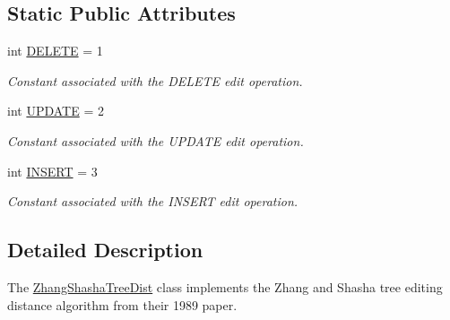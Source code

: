 \subsection*{Static Public Attributes}
\begin{DoxyCompactItemize}
\item 
\hypertarget{classxutools_1_1distances_1_1_zhang_shasha_tree_dist_a257fb5289527a7a6a44dfaf47324e270}{int \hyperlink{classxutools_1_1distances_1_1_zhang_shasha_tree_dist_a257fb5289527a7a6a44dfaf47324e270}{D\-E\-L\-E\-T\-E} = 1}\label{classxutools_1_1distances_1_1_zhang_shasha_tree_dist_a257fb5289527a7a6a44dfaf47324e270}

\begin{DoxyCompactList}\small\item\em Constant associated with the D\-E\-L\-E\-T\-E edit operation. \end{DoxyCompactList}\item 
\hypertarget{classxutools_1_1distances_1_1_zhang_shasha_tree_dist_a59a1dc0695c9a224ec9eb9d6ab1ebc3b}{int \hyperlink{classxutools_1_1distances_1_1_zhang_shasha_tree_dist_a59a1dc0695c9a224ec9eb9d6ab1ebc3b}{U\-P\-D\-A\-T\-E} = 2}\label{classxutools_1_1distances_1_1_zhang_shasha_tree_dist_a59a1dc0695c9a224ec9eb9d6ab1ebc3b}

\begin{DoxyCompactList}\small\item\em Constant associated with the U\-P\-D\-A\-T\-E edit operation. \end{DoxyCompactList}\item 
\hypertarget{classxutools_1_1distances_1_1_zhang_shasha_tree_dist_aca383b3f3bd06fcfee4ddc682bfa513c}{int \hyperlink{classxutools_1_1distances_1_1_zhang_shasha_tree_dist_aca383b3f3bd06fcfee4ddc682bfa513c}{I\-N\-S\-E\-R\-T} = 3}\label{classxutools_1_1distances_1_1_zhang_shasha_tree_dist_aca383b3f3bd06fcfee4ddc682bfa513c}

\begin{DoxyCompactList}\small\item\em Constant associated with the I\-N\-S\-E\-R\-T edit operation. \end{DoxyCompactList}\end{DoxyCompactItemize}


\subsection{Detailed Description}
The \hyperlink{classxutools_1_1distances_1_1_zhang_shasha_tree_dist}{Zhang\-Shasha\-Tree\-Dist} class implements the Zhang and Shasha tree editing distance algorithm from their 1989 paper. 



